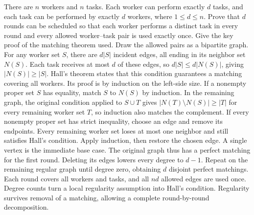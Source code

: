 There are $n$ workers and $n$ tasks. Each worker can perform exactly $d$ tasks, and each task can be performed by exactly $d$ workers, where $1\le d\le n$. Prove that $d$ rounds can be scheduled so that each worker performs a distinct task in every round and every allowed worker--task pair is used exactly once. Give the key proof of the matching theorem used.
\solution Draw the allowed pairs as a bipartite graph. For any worker set $S$, there are $d|S|$ incident edges, all ending in its neighbor set $N(S)$. Each task receives at most $d$ of these edges, so $d|S|\le d|N(S)|$, giving $|N(S)|\ge|S|$.
Hall's theorem states that this condition guarantees a matching covering all workers. Its proof is by induction on the left-side size. If a nonempty proper set $S$ has equality, match $S$ to $N(S)$ by induction. In the remaining graph, the original condition applied to $S\cup T$ gives $|N(T)\setminus N(S)|\ge|T|$ for every remaining worker set $T$, so induction also matches the complement.
If every nonempty proper set has strict inequality, choose an edge and remove its endpoints. Every remaining worker set loses at most one neighbor and still satisfies Hall's condition. Apply induction, then restore the chosen edge. A single vertex is the immediate base case.
The original graph thus has a perfect matching for the first round. Deleting its edges lowers every degree to $d-1$. Repeat on the remaining regular graph until degree zero, obtaining $d$ disjoint perfect matchings. Each round covers all workers and tasks, and all $nd$ allowed edges are used once.
\insight Degree counts turn a local regularity assumption into Hall's condition. Regularity survives removal of a matching, allowing a complete round-by-round decomposition.

